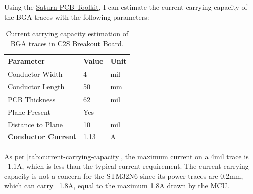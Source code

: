 Using the \href{https://saturnpcb.com/saturn-pcb-toolkit/}{Saturn PCB Toolkit}, I can estimate the current carrying capacity of the BGA traces with the following parameters:

\begin{table}[H]
\centering
\begin{tabular}{|l|l|l|}
    \hline
\textbf{Parameter} & \textbf{Value} & \textbf{Unit} \\
\hline
Conductor Width & 4 & mil \\
\hline
Conductor Length & 50 & mm \\
\hline
PCB Thickness & 62 & mil \\
\hline
Plane Present & Yes & - \\
\hline
Distance to Plane & 10 & mil \\
\hline
\hline
\textbf{Conductor Current} & 1.13 & A \\
\hline
\end{tabular}
\caption{Current carrying capacity estimation of BGA traces in C2S Breakout Board.}
\label{tab:current-carrying-capacity}
\end{table}

As per \autoref{tab:current-carrying-capacity}, the maximum current on a 4mil trace is ~1.1A, which is less than the typical current requirement. The current carrying capacity is not a concern for the STM32N6 since its power traces are 0.2mm, which can carry ~1.8A, equal to the maximum 1.8A drawn by the MCU.
